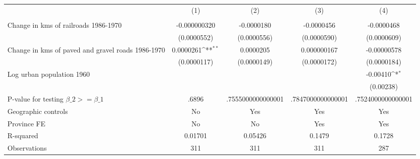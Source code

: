 {
\def\sym#1{\ifmmode^{#1}\else\(^{#1}\)\fi}
\begin{tabular}{l*{4}{c}}
\hline\hline
                &\multicolumn{1}{c}{(1)}&\multicolumn{1}{c}{(2)}&\multicolumn{1}{c}{(3)}&\multicolumn{1}{c}{(4)}\\
                &\multicolumn{1}{c}{}&\multicolumn{1}{c}{}&\multicolumn{1}{c}{}&\multicolumn{1}{c}{}\\
\hline
Change in kms of railroads 1986-1970&-0.000000320         &-0.0000180         &-0.0000456         &-0.0000468         \\
                &(0.0000552)         &(0.0000556)         &(0.0000590)         &(0.0000609)         \\
[1em]
Change in kms of paved and gravel roads 1986-1970&0.0000261\sym{**} &0.0000205         &0.000000167         &-0.00000578         \\
                &(0.0000117)         &(0.0000149)         &(0.0000172)         &(0.0000184)         \\
[1em]
Log urban population 1960&                  &                  &                  & -0.00410\sym{*}  \\
                &                  &                  &                  &(0.00238)         \\
\hline
P-value for testing $\beta\_{2} >= \beta\_{1}$&    .6896         &.7555000000000001         &.7847000000000001         &.7524000000000001         \\
Geographic controls&       No         &      Yes         &      Yes         &      Yes         \\
Province FE     &       No         &       No         &      Yes         &      Yes         \\
R-squared       &  0.01701         &  0.05426         &   0.1479         &   0.1728         \\
Observations    &      311         &      311         &      311         &      287         \\
\hline\hline
\end{tabular}
}
